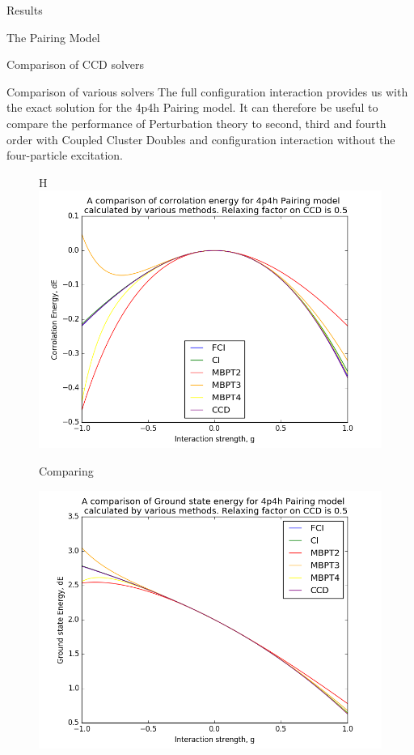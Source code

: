 \documentclass[twoside,english]{uiofysmaster}
\begin{document}
\begin{chapter}{Results}
\begin{section}{The Pairing Model}
\begin{subsection}{Comparison of CCD solvers}
		\end{subsection}
		\begin{subsection}{Comparison of various solvers}
			The full configuration interaction provides us with the exact solution for the 4p4h Pairing model. It can therefore be useful to compare the performance of Perturbation theory to second, third and fourth order with Coupled Cluster Doubles and configuration interaction without the four-particle excitation. 
			\begin{figure}H
				\includegraphics[width=\linewidth]{../Pairing_Model/Results/Figures/Pairing4p4h_CompareDE_AllMethods.png}
				\caption{Comparing }
				\label{Results4}
			\end{figure}

			\begin{figure}
				\includegraphics[width=\linewidth]{../Pairing_Model/Results/Figures/Pairing4p4h_CompareE_AllMethods.png}
				\caption{}
				\label{Results5}
			\end{figure}

		\end{subsection}


	\end{section}

\end{chapter}
\end{document}
